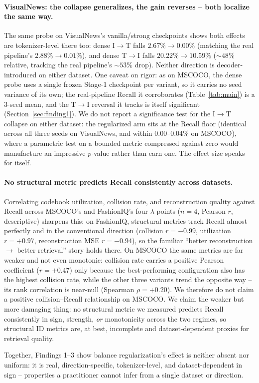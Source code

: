 \paragraph{VisualNews: the collapse generalizes, the gain reverses -- both localize the same way.} The same probe on VisualNews's vanilla/strong checkpoints shows both effects are tokenizer-level there too: dense I$\to$T falls $2.67\%\to0.00\%$ (matching the real pipeline's $2.88\%\to0.01\%$), and dense T$\to$I falls $20.22\%\to10.59\%$ ($\sim48\%$ relative, tracking the real pipeline's $\sim53\%$ drop). Neither direction is decoder-introduced on either dataset. One caveat on rigor: as on MSCOCO, the dense probe uses a single frozen Stage-1 checkpoint per variant, so it carries no seed variance of its own; the real-pipeline Recall it corroborates (Table~\ref{tab:main}) is a 3-seed mean, and the T$\to$I reversal it tracks is itself significant (Section~\ref{sec:finding1}). We do not report a significance test for the I$\to$T collapse on either dataset: the regularized arm sits at the Recall floor (identical across all three seeds on VisualNews, and within $0.00$--$0.04\%$ on MSCOCO), where a parametric test on a bounded metric compressed against zero would manufacture an impressive $p$-value rather than earn one. The effect size speaks for itself.

\paragraph{No structural metric predicts Recall consistently across datasets.} Correlating codebook utilization, collision rate, and reconstruction quality against Recall across MSCOCO's and FashionIQ's four $\lambda$ points ($n{=}4$, Pearson $r$, descriptive) sharpens this: on FashionIQ, structural metrics track Recall almost perfectly and in the conventional direction (collision $r{=}{-}0.99$, utilization $r{=}{+}0.97$, reconstruction MSE $r{=}{-}0.94$), so the familiar ``better reconstruction $\to$ better retrieval'' story holds there. On MSCOCO the same metrics are far weaker and not even monotonic: collision rate carries a positive Pearson coefficient ($r{=}{+}0.47$) only because the best-performing configuration also has the highest collision rate, while the other three variants trend the opposite way -- its rank correlation is near-null (Spearman $\rho{=}{+}0.20$). We therefore do not claim a positive collision--Recall relationship on MSCOCO. We claim the weaker but more damaging thing: no structural metric we measured predicts Recall consistently in sign, strength, \emph{or} monotonicity across the two regimes, so structural ID metrics are, at best, incomplete and dataset-dependent proxies for retrieval quality.

Together, Findings 1--3 show balance regularization's effect is neither absent nor uniform: it is real, direction-specific, tokenizer-level, and dataset-dependent in sign -- properties a practitioner cannot infer from a single dataset or direction.
